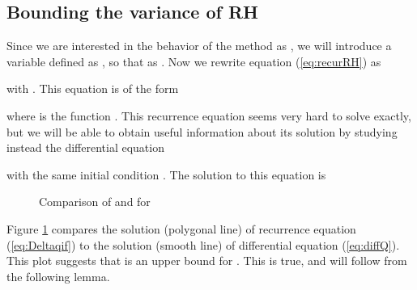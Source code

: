\documentclass[proceedings]{aofa}
\begin{document}
\subsection{Bounding the variance of RH}\label{BoundingRH}

Since we are interested in the behavior of the method as , we will introduce a variable  defined as , so that  as .
Now we rewrite equation (\ref{eq:recurRH}) as

with .
This equation is of the form

where  is the function .
This recurrence equation seems very hard to solve exactly, but we will be able to obtain useful information about its solution by studying instead the differential equation

with the same initial condition .
The solution to this equation is




\begin{figure}[htbp]
\begin{center}
\end{center}
\caption{Comparison of  and  for }
\label{plotqQ}
\end{figure}

Figure \ref{plotqQ} compares the solution  (polygonal line) of recurrence equation (\ref{eq:Deltaqif}) to the solution  (smooth line) of differential equation (\ref{eq:diffQ}). This plot suggests that  is an upper bound for . This is true, and will follow from the following lemma.
\end{document}
